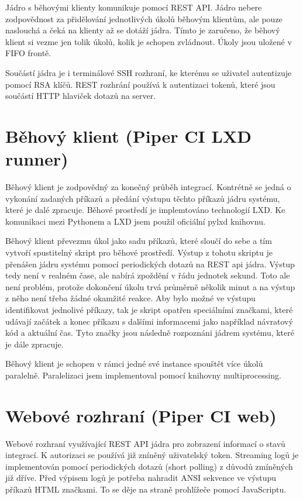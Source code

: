 Jádro s běhovými klienty komunikuje pomocí REST API.
Jádro nebere zodpovědnost za přidělování jednotlivých úkolů běhovým klientům, ale pouze naslouchá a čeká na klienty až se dotáží jádra.
Tímto je zaručeno, že běhový klient si vezme jen tolik úkolů, kolik je schopen zvládnout.
Úkoly jsou uložené v FIFO frontě.

Součástí jádra je i terminálové SSH rozhraní, ke kterému se uživatel autentizuje pomocí RSA klíčů.
REST rozhrání používá k autentizaci tokenů, které jsou součástí HTTP hlaviček dotazů na server.

\section{Běhový klient (Piper CI LXD runner)}

Běhový klient je zodpovědný za konečný průběh integrací.
Kontrétně se jedná o vykonání zadaných příkazů a předání výstupu těchto příkazů jádru systému, které je dalé zpracuje.
Běhové prostředí je implemtováno technologií LXD.
Ke komunikaci mezi Pythonem a LXD jsem použil oficiální pylxd knihovnu.

Běhový klient převezmu úkol jako sadu příkazů, které sloučí do sebe a tím vytvoří spustitelný skript pro běhové prostředí.
Výstup z tohotu skriptu je přenášen jádru systému pomocí periodických dotazů na REST api jádra.
Výstup tedy není  v realném čase, ale nabírá zpoždění v řádu jednotek sekund.
Toto ale není problém, protože dokončení úkolu trvá průměrně několik minut a na výstup z něho není třeba žádné okamžité reakce.
Aby bylo možné ve výstupu identifikovat jednolivé příkazy, tak je skript opatřen speciálními značkami, které udávají začátek a konec příkazu s dalšími informacemi jako například návratový kód a aktuální čas.
Tyto značky jsou následně rozpoznáni jádrem systému, které je dále zpracuje.

Běhový klient je schopen v rámci jedné své instance spouštět více úkolů paralelně.
Paralelizaci jsem implementoval pomocí knihovny multiprocessing.

\section{Webové rozhraní (Piper CI web)}

Webové rozhraní využívající REST API jádra pro zobrazení informací o stavů integrací.
K autorizaci se používá již zníněný uživatelský token.
Streaming logů je implementován pomocí periodických dotazů (short polling) z důvodů zmíněných již dříve.
Před výpisem logů je potřeba nahradit ANSI sekvence ve výstupu příkazů HTML značkami.
To se děje na straně prohlížeče pomocí JavaScriptu.

